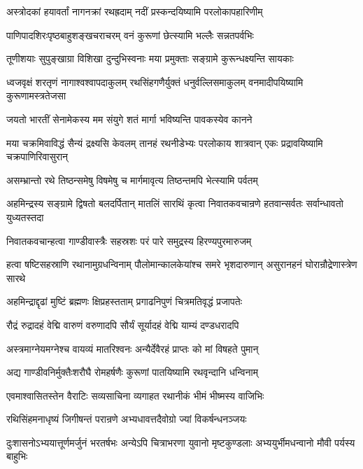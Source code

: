 \twolineshloka
{अस्त्रोदकां हयावर्तां नागनक्रां रथह्रदाम्}
{नदीं प्रस्कन्दयिष्यामि परलोकापहारिणीम्}


\twolineshloka
{पाणिपादशिरःपृष्ठबाहुशङ्खचराचरम्}
{वनं कुरूणां छेत्स्यामि भल्लैः सन्नतपर्वभिः}


\twolineshloka
{तूणीशयाः सुपुङ्खाग्रा विशिखा दुन्दुभिस्वनाः}
{मया प्रमुक्ताः सङ्ग्रामे कुरून्धक्ष्यन्ति सायकाः}


\threelineshloka
{ध्वजवृक्षं शरतृणं नागाश्वश्वापदाकुलम्}
{रथसिंहगणैर्युक्तं धनुर्वल्लिसमाकुलम्}
{वनमादीपयिष्यामि कुरूणामस्त्रतेजसा}


\twolineshloka
{जयतो भारतीं सेनामेकस्य मम संयुगे}
{शतं मार्गा भविष्यन्ति पावकस्येव कानने}


\threelineshloka
{मया चक्रमिवाविद्धं सैन्यं द्रक्ष्यसि केवलम्}
{तानहं रथनीडेभ्यः परलोकाय शात्रवान्}
{एकः प्रद्रावयिष्यामि चक्रपाणिरिवासुरान्}


\twolineshloka
{असम्भ्रान्तो रथे तिष्ठन्समेषु विषमेषु च}
{मार्गमावृत्य तिष्ठन्तमपि भेत्स्यामि पर्वतम्}


\threelineshloka
{अहमिन्द्रस्य सङ्ग्रामे द्विषतो बलदर्पितान्}
{मातलिं सारथिं कृत्वा निवातकवचान्रणे}
{हतवान्सर्वतः सर्वान्धावतो युध्यतस्तदा}


\twolineshloka
{निवातकवचान्हत्वा गाण्डीवास्त्रैः सहस्रशः}
{परं पारे समुद्रस्य हिरण्यपुरमारुजम्}


\threelineshloka
{हत्वा षष्टिसहस्राणि रथानामुग्रधन्विनाम्}
{पौलोमान्कालकेयांश्च समरे भृशदारुणान्}
{असुरानहनं घोरान्रौद्रेणास्त्रेण सारथे}


\twolineshloka
{अहमिन्द्राद्दृढां मुष्टिं ब्रह्मणः क्षिप्रहस्तताम्}
{प्रगाढनिपुणं चित्रमतिवृद्धं प्रजापतेः}


\twolineshloka
{रौद्रं रुद्रादहं वेद्मि वारुणं वरुणादपि}
{सौर्यं सूर्यादहं वेद्मि याम्यं दण्डधरादपि}


\twolineshloka
{अस्त्रमाग्नेयमग्नेश्च वायव्यं मातरिश्वनः}
{अन्यैर्देवैरहं प्राप्तः को मां विषहते पुमान्}


\twolineshloka
{अद्य गाण्डीवनिर्मुक्तैःशरौघै रोमहर्षणैः}
{कुरूणां पातयिष्यामि रथवृन्दानि धन्विनाम्}



\twolineshloka
{एवमाश्वासितस्तेन वैराटिः सव्यसाचिना}
{व्यगाहत रथानीकं भीमं भीष्मस्य वाजिभिः}


\twolineshloka
{रथिसिंहमनाधृष्यं जिगीषन्तं परान्रणे}
{अभ्यधावत्तदैवोग्रो ज्यां विकर्षन्धनञ्जयः}


\onelineshloka
{दुःशासनोऽभ्ययात्तूर्णमर्जुनं भरतर्षभः}
\twolineshloka
{अन्येऽपि चित्राभरणा युवानो मृष्टकुण्डलाः}
{अभ्ययुर्भीमधन्वानो मौवी पर्यस्य बाहुभिः}


